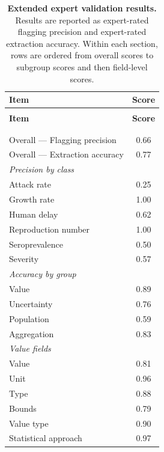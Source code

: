 {\footnotesize
\begin{longtable}{>{\raggedright\arraybackslash}p{10.8cm} S[table-format=1.2, round-mode=places, round-precision=2]}
\caption{\textbf{Extended expert validation results.} Results are reported as expert-rated flagging precision and expert-rated extraction accuracy. Within each section, rows are ordered from overall scores to subgroup scores and then field-level scores.}
\label{tab:expert_validation_results} \\
\toprule
\textbf{Item} & {\textbf{Score}} \\
\midrule
\endfirsthead

 \\
\toprule
\textbf{Item} & {\textbf{Score}} \\
\midrule
\endhead

\midrule
{} \\
\endfoot

\bottomrule
\endlastfoot

 \\
\addlinespace[0.2em]
Overall --- Flagging precision & 0.66 \\
Overall --- Extraction accuracy & 0.77 \\

\addlinespace[0.35em]
\textit{Precision by class} & {} \\
\quad Attack rate & 0.25 \\
\quad Growth rate & 1.00 \\
\quad Human delay & 0.62 \\
\quad Reproduction number & 1.00 \\
\quad Seroprevalence & 0.50 \\
\quad Severity & 0.57 \\

\addlinespace[0.35em]
\textit{Accuracy by group} & {} \\
\quad Value & 0.89 \\
\quad Uncertainty & 0.76 \\
\quad Population & 0.59 \\
\quad Aggregation & 0.83 \\

\addlinespace[0.35em]
\textit{Value fields} & {} \\
\quad Value & 0.81 \\
\quad Unit & 0.96 \\
\quad Type & 0.88 \\
\quad Bounds & 0.79 \\
\quad Value type & 0.90 \\
\quad Statistical approach & 0.97 \\


\end{longtable}}
